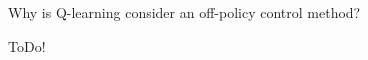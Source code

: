 
\begin{exercise}[Exercise 6.11]

Why is Q-learning consider an off-policy control method?

\end{exercise}


\begin{solution}

ToDo!

\end{solution}


